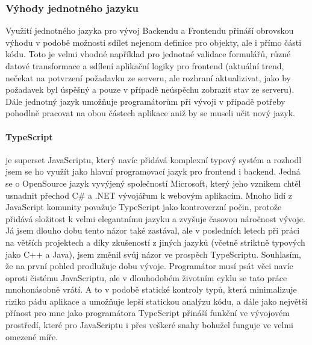 \subsubsection{Výhody jednotného jazyku}
Využití jednotného jazyka pro vývoj Backendu a Frontendu přináší obrovskou výhodu v podobě možnosti sdílet nejenom definice pro objekty, ale i přímo části kódu. Toto je velmi vhodné například pro jednotné validace formulářů, různé datové transformace a sdílení aplikační logiky pro frontend  (aktuální trend, nečekat na potvrzení požadavku ze serveru, ale rozhraní aktualizivat, jako by požadavek byl úspěšný a pouze v případě neúspěchu zobrazit stav ze serveru). Dále jednotný jazyk umožňuje programátorům při vývoji v případě potřeby pohodlně pracovat na obou částech aplikace aniž by se museli učit nový jazyk.

\paragraph{TypeScript} je superset JavaScriptu, který navíc přidává komplexní typový systém a rozhodl jsem se ho využít jako hlavní programovací jazyk pro frontend i backend. Jedná se o OpenSource jazyk vyvýjený společností Microsoft, který jeho vznikem chtěl usnadnit přechod C\# a .NET vývojářum k webovým aplikacím. Mnoho lidí z JavaScript komunity považuje TypeScript jako kontroverzní počin, protože přidává složitost k velmi elegantnímu jazyku a zvyšuje časovou náročnost vývoje. Já jsem dlouho dobu tento názor také zastával, ale v posledních letech při práci na větších projektech a díky zkušeností z jiných jazyků (včetně striktně typových jako C++ a Java), jsem změnil svůj názor ve prospěch TypeScriptu. Souhlasím, že na první pohled prodlužuje dobu vývoje. Programátor musí psát věci navíc oproti čistému JavaScriptu, ale v dlouhodobém životním cyklu se tato práce  mnohonásobně vrátí. A to v podobě statické kontroly typů, která minimalizuje riziko pádu aplikace a umožňuje  lepší statickou analýzu kódu, a dále jako největší přínost pro mne jako programátora TypeScript přináší funkční  ve vývojovém prostředí, které pro JavaScriptu i přes veškeré snahy bohužel funguje ve velmi omezené míře.

